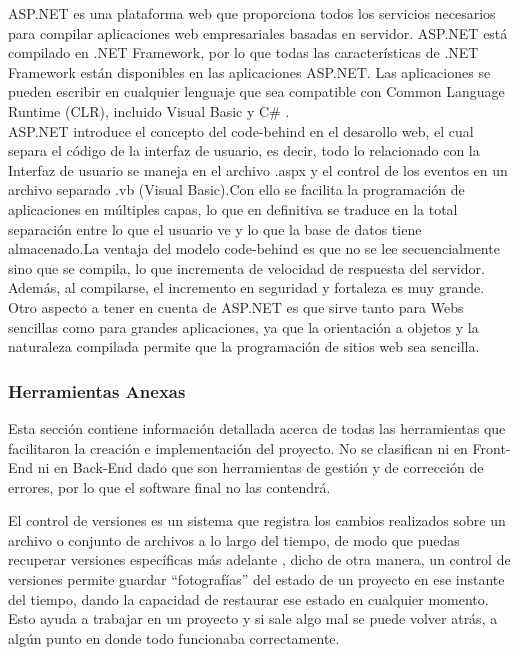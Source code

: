  \label{ASP.NET}

ASP.NET es una plataforma web que proporciona todos los servicios necesarios para compilar aplicaciones web empresariales basadas en servidor. ASP.NET está compilado en .NET Framework, por lo que todas las características de .NET Framework están disponibles en las aplicaciones ASP.NET. Las aplicaciones se pueden escribir en cualquier lenguaje que sea compatible con Common Language Runtime (CLR), incluido Visual Basic y C\# \cite{inf15}. 
\\

ASP.NET  introduce el concepto del code-behind en el desarollo web, el cual separa el código de la interfaz de usuario, es decir,  todo lo relacionado con la Interfaz de usuario se maneja en el archivo .aspx y el control de los eventos en un archivo separado .vb (Visual Basic).Con ello se facilita la programación de aplicaciones en múltiples capas, lo que en definitiva se traduce en la total separación entre lo que el usuario ve y lo que la base de datos tiene almacenado.La ventaja del modelo  code-behind  es que no se lee secuencialmente sino que se compila, lo que incrementa de velocidad de respuesta del servidor. Además, al compilarse, el incremento en seguridad y fortaleza es muy grande. 
\\

Otro aspecto a tener en cuenta de ASP.NET es que sirve tanto para Webs sencillas como para grandes aplicaciones, ya que la orientación a objetos y la naturaleza compilada permite que la programación de sitios web sea sencilla.

\subsubsection{Herramientas Anexas}

	Esta sección contiene información detallada acerca de todas las herramientas  que  facilitaron la creación e implementación del proyecto. No se clasifican ni en Front-End ni en Back-End dado que son herramientas de gestión y de corrección de errores, por lo que el software final no las contendrá.
	
	 El control de versiones es un sistema que registra los cambios realizados sobre un archivo o conjunto de archivos a lo largo del tiempo, de modo que puedas recuperar versiones específicas más adelante \cite{git15}, dicho de otra manera, un control de versiones permite guardar “fotografías” del estado de un proyecto en ese instante del tiempo, dando la capacidad de restaurar ese estado en cualquier momento. Esto ayuda a trabajar en un proyecto y si sale algo mal se puede volver atrás, a algún punto en donde todo funcionaba correctamente.
	 \\
	 
